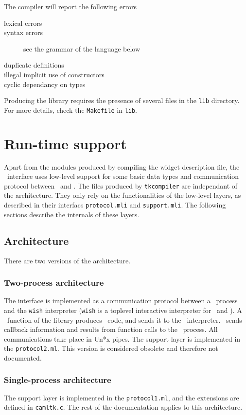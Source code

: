 The compiler will report the following errors
\begin{description}
\item[lexical errors]
\item[syntax errors] see the grammar of the language below
\item[duplicate definitions]
\item[illegal implicit use of constructors]
\item[cyclic dependancy on types]
\end{description} 

Producing the library requires the presence of several files in the
\verb|lib| directory. For more details, check the \verb|Makefile| in
\verb|lib|. 

\section{Run-time support}
Apart from the modules produced by compiling the widget description file,
the \camltk\ interface uses low-level support for some basic data types and
communication protocol between \caml\ and \tcl.
The files produced by \verb|tkcompiler| are independant of the
architecture. They only rely on the functionalities of the low-level layers,
as described in their interfacs \verb|protocol.mli| and \verb|support.mli|.
The following sections describe the internals of these layers.

\subsection{Architecture}
There are two versions of the architecture.
\subsubsection{Two-process architecture}
The interface is implemented as a communication protocol between a \caml\
process and the {\tt wish} interpreter ({\tt wish} is a toplevel interactive
interpreter for  \tcl\ and \tk).
A \caml\ function of the library produces \tcl\tk\ code, and sends it to the
\wish\ interpreter. \wish\ sends callback information and results from
function calls to the \caml\ process.
All communications take place in Un*x pipes.
The support layer is implemented in the \verb|protocol2.ml|.
This version is considered obsolete and therefore not documented.

\subsubsection{Single-process architecture}
The support layer is implemented in the \verb|protocol1.ml|, and the
extensions are defined in \verb|camltk.c|. The rest of the documentation
applies to this architecture.

